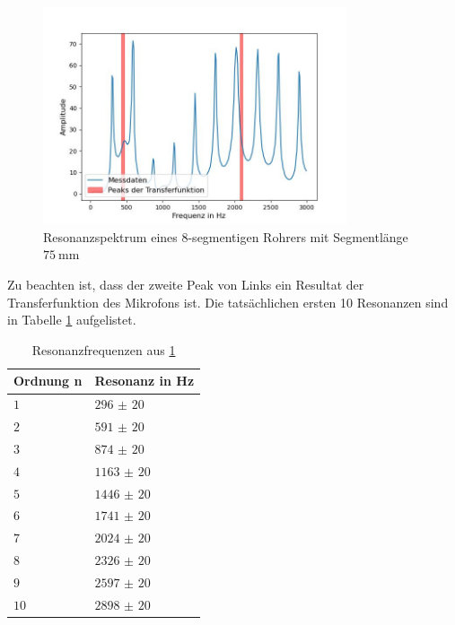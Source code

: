 \documentclass[../main.tex]{subfiles}
\begin{document}
        \begin{figure}[H]
            \centering
            \includegraphics[width=0.8\textwidth]{Bilddateien/Auswertung/I_c_Resonanzspektrum.jpg}
            \caption{Resonanzspektrum eines 8-segmentigen Rohrers mit Segmentlänge $\SI{75}{\milli\metre}$}
            \label{fig:I_c_Resonanzspektrum}
        \end{figure}

        Zu beachten ist, dass der zweite Peak von Links ein Resultat der Transferfunktion des Mikrofons ist. Die tatsächlichen ersten 10 Resonanzen sind in Tabelle \ref{tab:I_c_Resonanzspektrum} aufgelistet.
        
        \begin{table}[H]
            \centering
            \begin{tabular}{l|l}
                \textbf{Ordnung n} & \textbf{Resonanz in Hz}\\
                \hline\hline
                $\num{1}$ & $\num{296(20)}$\\
                \hline
                $\num{2}$ & $\num{591(20)}$\\
                \hline
                $\num{3}$ & $\num{874(20)}$\\
                \hline
                $\num{4}$ & $\num{1163(20)}$\\
                \hline
                $\num{5}$ & $\num{1446(20)}$\\
                \hline
                $\num{6}$ & $\num{1741(20)}$\\
                \hline
                $\num{7}$ & $\num{2024(20)}$\\
                \hline
                $\num{8}$ & $\num{2326(20)}$\\
                \hline
                $\num{9}$ & $\num{2597(20)}$\\
                \hline
                $\num{10}$ & $\num{2898(20)}$\\
            \end{tabular}
            \caption{Resonanzfrequenzen aus \ref{fig:I_c_Resonanzspektrum}}
            \label{tab:I_c_Resonanzspektrum}
        \end{table}
\end{document}
